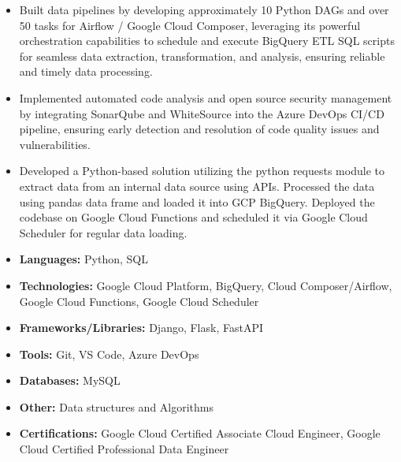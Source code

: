 \documentclass[10pt,a4paper,ragged2e]{altacv}
\begin{document}
\smallskip
{}
\begin{itemize}
\item Built data pipelines by developing approximately 10 Python DAGs and over 50 tasks for Airflow / Google Cloud Composer, leveraging its powerful orchestration capabilities to schedule and execute BigQuery ETL SQL scripts for seamless data extraction, transformation, and analysis, ensuring reliable and timely data processing.
\item Implemented automated code analysis and open source security management by integrating SonarQube and WhiteSource into the Azure DevOps CI/CD pipeline, ensuring early detection and resolution of code quality issues and vulnerabilities.
\item Developed a Python-based solution utilizing the python requests module to extract data from an internal data source using APIs. Processed the data using pandas data frame and loaded it into GCP BigQuery. Deployed the codebase on Google Cloud Functions and scheduled it via Google Cloud Scheduler for regular data loading.
\smallskip
\end{itemize}


\smallskip
\begin{itemize}
\item \textbf{Languages:} Python, SQL
\item \textbf{Technologies:} Google Cloud Platform, BigQuery, Cloud Composer/Airflow, Google Cloud Functions, Google Cloud Scheduler
\item \textbf{Frameworks/Libraries:} Django, Flask, FastAPI
\item \textbf{Tools:} Git, VS Code, Azure DevOps
\item \textbf{Databases:} MySQL
\item \textbf{Other:} Data structures and Algorithms
\item \textbf{Certifications:} Google Cloud Certified Associate Cloud Engineer, Google Cloud Certified Professional Data Engineer
\end{itemize}
\end{document}
